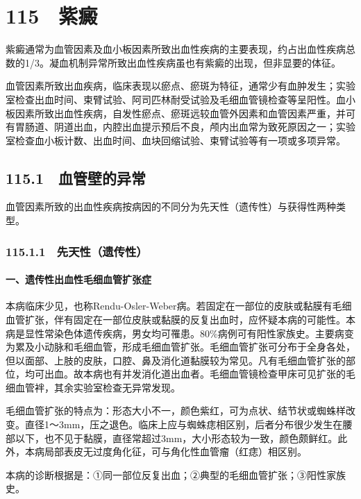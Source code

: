 \protect\hypertarget{text00264.html}{}{}

\section{115　紫癜}

紫癜通常为血管因素及血小板因素所致出血性疾病的主要表现，约占出血性疾病总数的1/3。凝血机制异常所致出血性疾病虽也有紫癜的出现，但非显要的体征。

血管因素所致出血疾病，临床表现以瘀点、瘀斑为特征，通常少有血肿发生；实验室检查出血时间、束臂试验、阿司匹林耐受试验及毛细血管镜检查等呈阳性。血小板因素所致出血性疾病，自发性瘀点、瘀斑远较血管外因素和血管因素严重，并可有胃肠道、阴道出血，内腔出血提示预后不良，颅内出血常为致死原因之一；实验室检查血小板计数、出血时间、血块回缩试验、束臂试验等有一项或多项异常。

\subsection{115.1　血管壁的异常}

血管因素所致的出血性疾病按病因的不同分为先天性（遗传性）与获得性两种类型。

\subsubsection{115.1.1　先天性（遗传性）}

\paragraph{一、遗传性出血性毛细血管扩张症}

本病临床少见，也称Rendu-Osler-Weber病。若固定在一部位的皮肤或黏膜有毛细血管扩张，伴有固定在一部位皮肤或黏膜的反复出血时，应怀疑本病的可能性。本病是显性常染色体遗传疾病，男女均可罹患。80\%病例可有阳性家族史。主要病变为累及小动脉和毛细血管，形成毛细血管扩张。毛细血管扩张可分布于全身各处，但以面部、上肢的皮肤，口腔、鼻及消化道黏膜较为常见。凡有毛细血管扩张的部位，均可出血。故本病也有并发消化道出血者。毛细血管镜检查甲床可见扩张的毛细血管袢，其余实验室检查无异常发现。

毛细血管扩张的特点为：形态大小不一，颜色紫红，可为点状、结节状或蜘蛛样改变。直径1～3mm，压之退色。临床上应与蜘蛛痣相区别，后者分布很少发生在腰部以下，也不见于黏膜，直径常超过3mm，大小形态较为一致，颜色颇鲜红。此外，本病局部表皮无过度角化征，可与角化性血管瘤（红痣）相区别。

本病的诊断根据是：①同一部位反复出血；②典型的毛细血管扩张；③阳性家族史。


